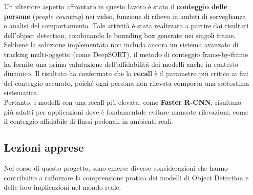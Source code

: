 \documentclass[12pt]{article}
\begin{document}
Un ulteriore aspetto affrontato in questo lavoro è stato il \textbf{conteggio delle persone} (\textit{people counting}) nei video, funzione di rilievo in ambiti di sorveglianza e analisi del comportamento. Tale attività è stata realizzata a partire dai risultati dell'object detection, combinando le bounding box generate nei singoli frame. Sebbene la soluzione implementata non includa ancora un sistema avanzato di tracking multi-oggetto (come DeepSORT), il metodo di conteggio frame-by-frame ha fornito una prima valutazione dell'affidabilità dei modelli anche in contesto dinamico. Il risultato ha confermato che la \textbf{recall} è il parametro più critico ai fini del conteggio accurato, poiché ogni persona non rilevata comporta una sottostima sistematica.\\
Pertanto, i modelli con una recall più elevata, come \textbf{Faster R-CNN}, risultano più adatti per applicazioni dove è fondamentale evitare mancate rilevazioni, come il conteggio affidabile di flussi pedonali in ambienti reali.

\vspace{1em}
\subsection{Lezioni apprese}

Nel corso di questo progetto, sono emerse diverse considerazioni che hanno contribuito a rafforzare la comprensione pratica dei modelli di Object Detection e delle loro implicazioni nel mondo reale:
\end{document}
